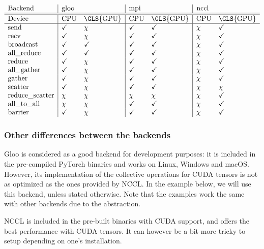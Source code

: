 \documentclass{article}
\begin{document}
\[\begin{array}{l|ll|ll|ll}
  \text{Backend} & \text{\lstinline{gloo}} & & \text{\lstinline{mpi}} & & \text{\lstinline{nccl}} \\
  \hline\hline
  \text{Device} & \text{CPU} & \text{\GLS{GPU}} & \text{CPU} & \text{\GLS{GPU}} & \text{CPU} & \text{\GLS{GPU}} \\
  \hline
  \text{send} & \checkmark & \chi & \checkmark & \checkmark & \chi & \checkmark \\
  \text{recv} & \checkmark & \chi & \checkmark & \checkmark & \chi & \checkmark \\
  \text{broadcast} & \checkmark & \checkmark & \checkmark & \checkmark & \chi & \checkmark \\
  \text{all\_reduce} & \checkmark & \checkmark & \checkmark & \checkmark & \chi & \checkmark \\
  \text{reduce} & \checkmark & \chi & \checkmark & \checkmark & \chi & \checkmark \\
  \text{all\_gather} & \checkmark & \chi & \checkmark & \checkmark & \chi & \checkmark \\
  \text{gather} & \checkmark & \chi & \checkmark & \checkmark & \chi & \checkmark \\
  \text{scatter} & \checkmark & \chi & \checkmark & \checkmark & \chi & \chi \\
  \text{reduce\_scatter} & \chi & \chi & \chi & \chi & \chi & \checkmark \\
  \text{all\_to\_all} & \chi & \chi & \checkmark & \checkmark & \chi & \checkmark \\
  \text{barrier} & \checkmark & \chi & \checkmark & \checkmark & \chi & \checkmark
\end{array}\]

\subsubsection{Other differences between the backends}
Gloo is considered as a good backend for development purposes: it is included in the pre-compiled PyTorch binaries and works on Linux, Windows and macOS. However, its implementation of the collective operations for CUDA tensors is not as optimized as the ones provided by NCCL. In the example below, we will use this backend, unless stated otherwise. Note that the examples work the same with other backends due to the abstraction.

NCCL is included in the pre-built binaries with CUDA support, and offers the best performance with CUDA tensors. It can however be a bit more tricky to setup depending on one's installation.
\end{document}
